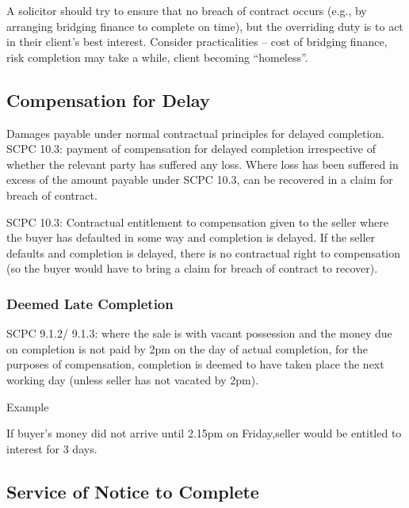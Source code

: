 \documentclass[
]{article}
\newenvironment{env-4d86b145-82dd-4772-a680-deba5516c751}
{
    \savenotes\tcolorbox[blanker,breakable,left=5pt,borderline west={2pt}{-4pt}{purple}]
}
{
    \endtcolorbox\spewnotes
}
\begin{document}
A solicitor should try to ensure that no breach of contract occurs
(e.g., by arranging bridging finance to complete on time), but the
overriding duty is to act in their client's best interest. Consider
practicalities -- cost of bridging finance, risk completion may take a
while, client becoming ``homeless''.

\hypertarget{compensation-for-delay}{%
\subsection{Compensation for Delay}\label{compensation-for-delay}}

Damages payable under normal contractual principles for delayed
completion. SCPC 10.3: payment of compensation for delayed completion
irrespective of whether the relevant party has suffered any loss. Where
loss has been suffered in excess of the amount payable under SCPC 10.3,
can be recovered in a claim for breach of contract.

SCPC 10.3: Contractual entitlement to compensation given to the seller
where the buyer has defaulted in some way and completion is delayed. If
the seller defaults and completion is delayed, there is no contractual
right to compensation (so the buyer would have to bring a claim for
breach of contract to recover).

\hypertarget{deemed-late-completion}{%
\subsubsection{Deemed Late Completion}\label{deemed-late-completion}}

SCPC 9.1.2/ 9.1.3: where the sale is with vacant possession and the
money due on completion is not paid by 2pm on the day of actual
completion, for the purposes of compensation, completion is deemed to
have taken place the next working day (unless seller has not vacated by
2pm).

\begin{env-4d86b145-82dd-4772-a680-deba5516c751}

Example

If buyer's money did not arrive until 2.15pm on Friday,seller would be
entitled to interest for 3 days.

\end{env-4d86b145-82dd-4772-a680-deba5516c751}

\hypertarget{service-of-notice-to-complete}{%
\subsection{Service of Notice to
Complete}\label{service-of-notice-to-complete}}
\end{document}
